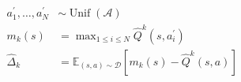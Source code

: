 \documentclass[border=7pt]{standalone}
\begin{document}
\color{ink}
$\displaystyle \begin{aligned} a_1^\prime,\ldots,a_N^\prime&\sim\operatorname{Unif}(\mathcal A)\\ m_k(s)&=\max_{1\leq i\leq N}\widehat Q^k(s,a_i^\prime)\\ \widehat\Delta_k&=\mathbb E_{(s,a)\sim\mathcal D}\!\left[m_k(s)-\widehat Q^k(s,a)\right]\end{aligned}$
\end{document}
